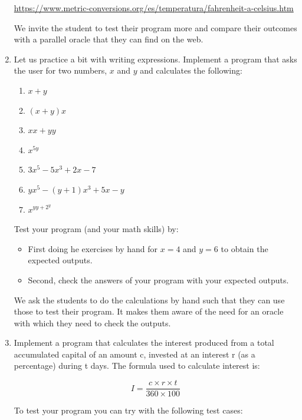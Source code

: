 \documentclass[
  fontsize=10pt,
  a4paper,
]{scrartcl}
\newenvironment{howTILEd}%
  {\begin{mdframed}[skipabove=10pt,skipbelow=10pt,backgroundcolor=pink!40]}%
  {\end{mdframed}}
\begin{document}
\begin{enumerate}
\url{https://www.metric-conversions.org/es/temperatura/fahrenheit-a-celsius.htm}

\begin{howTILEd}
We invite the student to test their program more and compare their outcomes with a parallel oracle that they can find on the web.
\end{howTILEd}

\item Let us practice a bit with writing expressions. Implement a program that asks the user for two numbers, $x$ and $y$ and calculates the following:
\begin{enumerate}
  \item $x+y$
  \item $(x+y)x$ 
  \item $xx + yy$
  \item $x^{5y}$
  \item $3x^5-5x^3+2x-7$
  \item $yx^5-(y+1)x^3+5x-y$
  \item $x^{yy+2^y}$
\end{enumerate}

Test your program (and your math skills) by:
\begin{itemize}
\item First doing he exercises by hand for $x=4$ and $y=6$ to obtain the expected outputs.
\item Second, check the answers of your program with your expected outputs.
\end{itemize}

\begin{howTILEd}
We ask the students to do the calculations by hand such that they can use those to test their program. It makes them aware of the need for an oracle with which they need to check the outputs.
\end{howTILEd}

\item Implement a program that calculates the interest produced from a total accumulated capital of an amount c, invested at an interest r (as a percentage) during t days. The formula used to calculate interest is:

$$I=\frac{c \times r \times t}{360 \times 100}$$


To test your program you can try with the following test cases:


\end{enumerate}
\end{document}
